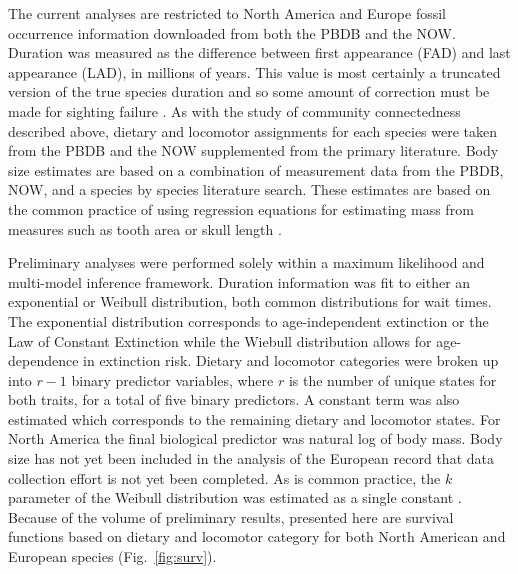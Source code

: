 \documentclass[11pt,letterpaper]{article}
\begin{document}
The current analyses are restricted to North America and Europe fossil occurrence information downloaded from both the PBDB and the NOW. Duration was measured as the difference between first appearance (FAD) and last appearance (LAD), in millions of years. This value is most certainly a truncated version of the true species duration and so some amount of correction must be made for sighting failure \citep{Alroy2014a,Solow1997,Strauss1989}. As with the study of community connectedness described above, dietary and locomotor assignments for each species were taken from the PBDB and the NOW supplemented from the primary literature. Body size estimates are based on a combination of measurement data from the PBDB, NOW, and a species by species literature search. These estimates are based on the common practice of using regression equations for estimating mass from measures such as tooth area or skull length \citep{Alroy1998,Tomiya2013,Jernvall2004,Alroy2009,Slater2013a}. 

Preliminary analyses were performed solely within a maximum likelihood and multi-model inference framework. Duration information was fit to either an exponential or Weibull distribution, both common distributions for wait times. The exponential distribution corresponds to age-independent extinction or the Law of Constant Extinction \citep{VanValen1973} while the Wiebull distribution allows for age-dependence in extinction risk. Dietary and locomotor categories were broken up into \(r - 1\) binary predictor variables, where \(r\) is the number of unique states for both traits, for a total of five binary predictors. A constant term was also estimated which corresponds to the remaining dietary and locomotor states. For North America the final biological predictor was natural log of body mass. Body size has not yet been included in the analysis of the European record that data collection effort is not yet been completed. As is common practice, the \(k\) parameter of the Weibull distribution was estimated as a single constant \citep{Kleinbaum2005}. Because of the volume of preliminary results, presented here are survival functions based on dietary and locomotor category for both North American and European species (Fig.~\ref{fig:surv}).
 
\end{document}
